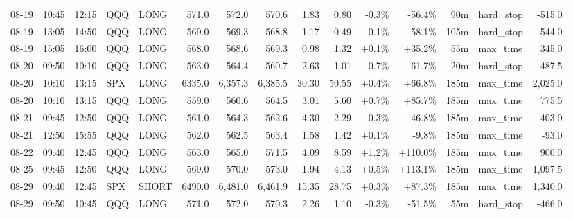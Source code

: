 \documentclass[11pt,a4paper,twoside]{article}
\begin{document}
\begin{landscape}
\begin{center}
\begin{longtable}{>{\color{txtmain}}l l l l l r r r r r r r r >{\color{txtmain}}l r}
08-19 & 10:45 & 12:15 & QQQ & LONG & 571.0 & 572.0 & 570.6 & 1.83 & 0.80 & \textcolor{lossred}{-0.3\%} & \textcolor{lossred}{-56.4\%} & 90m & hard\_stop & \textcolor{lossred}{-515.0} \\
08-19 & 13:05 & 14:50 & QQQ & LONG & 569.0 & 569.3 & 568.8 & 1.17 & 0.49 & \textcolor{lossred}{-0.1\%} & \textcolor{lossred}{-58.1\%} & 105m & hard\_stop & \textcolor{lossred}{-544.0} \\
08-19 & 15:05 & 16:00 & QQQ & LONG & 568.0 & 568.6 & 569.3 & 0.98 & 1.32 & \textcolor{wingreen}{+0.1\%} & \textcolor{wingreen}{+35.2\%} & 55m & max\_time & \textcolor{wingreen}{345.0} \\
08-20 & 09:50 & 10:10 & QQQ & LONG & 563.0 & 564.4 & 560.7 & 2.63 & 1.01 & \textcolor{lossred}{-0.7\%} & \textcolor{lossred}{-61.7\%} & 20m & hard\_stop & \textcolor{lossred}{-487.5} \\
08-20 & 10:10 & 13:15 & SPX & LONG & 6335.0 & 6,357.3 & 6,385.5 & 30.30 & 50.55 & \textcolor{wingreen}{+0.4\%} & \textcolor{wingreen}{+66.8\%} & 185m & max\_time & \textcolor{wingreen}{2,025.0} \\
08-20 & 10:10 & 13:15 & QQQ & LONG & 559.0 & 560.6 & 564.5 & 3.01 & 5.60 & \textcolor{wingreen}{+0.7\%} & \textcolor{wingreen}{+85.7\%} & 185m & max\_time & \textcolor{wingreen}{775.5} \\
08-21 & 09:45 & 12:50 & QQQ & LONG & 561.0 & 564.3 & 562.6 & 4.30 & 2.29 & \textcolor{lossred}{-0.3\%} & \textcolor{lossred}{-46.8\%} & 185m & max\_time & \textcolor{lossred}{-403.0} \\
08-21 & 12:50 & 15:55 & QQQ & LONG & 562.0 & 562.5 & 563.4 & 1.58 & 1.42 & \textcolor{wingreen}{+0.1\%} & \textcolor{lossred}{-9.8\%} & 185m & max\_time & \textcolor{lossred}{-93.0} \\
08-22 & 09:40 & 12:45 & QQQ & LONG & 563.0 & 565.0 & 571.5 & 4.09 & 8.59 & \textcolor{wingreen}{+1.2\%} & \textcolor{wingreen}{+110.0\%} & 185m & max\_time & \textcolor{wingreen}{900.0} \\
08-25 & 09:45 & 12:50 & QQQ & LONG & 569.0 & 570.0 & 573.0 & 1.94 & 4.13 & \textcolor{wingreen}{+0.5\%} & \textcolor{wingreen}{+113.1\%} & 185m & max\_time & \textcolor{wingreen}{1,097.5} \\
08-29 & 09:40 & 12:45 & SPX & SHORT & 6490.0 & 6,481.0 & 6,461.9 & 15.35 & 28.75 & \textcolor{wingreen}{+0.3\%} & \textcolor{wingreen}{+87.3\%} & 185m & max\_time & \textcolor{wingreen}{1,340.0} \\
08-29 & 09:50 & 10:45 & QQQ & LONG & 571.0 & 572.0 & 570.3 & 2.26 & 1.10 & \textcolor{lossred}{-0.3\%} & \textcolor{lossred}{-51.5\%} & 55m & hard\_stop & \textcolor{lossred}{-466.0} \\

\end{longtable}
\end{center}
\end{landscape}
\end{document}
